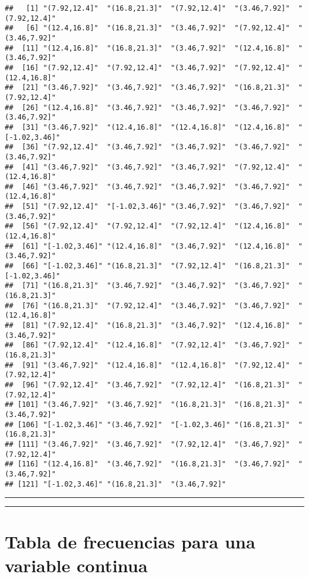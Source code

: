 \documentclass[
]{book}
\begin{document}
\begin{verbatim}
##   [1] "(7.92,12.4]"  "(16.8,21.3]"  "(7.92,12.4]"  "(3.46,7.92]"  "(7.92,12.4]" 
##   [6] "(12.4,16.8]"  "(16.8,21.3]"  "(3.46,7.92]"  "(7.92,12.4]"  "(3.46,7.92]" 
##  [11] "(12.4,16.8]"  "(16.8,21.3]"  "(3.46,7.92]"  "(12.4,16.8]"  "(3.46,7.92]" 
##  [16] "(7.92,12.4]"  "(7.92,12.4]"  "(3.46,7.92]"  "(7.92,12.4]"  "(12.4,16.8]" 
##  [21] "(3.46,7.92]"  "(3.46,7.92]"  "(3.46,7.92]"  "(16.8,21.3]"  "(7.92,12.4]" 
##  [26] "(12.4,16.8]"  "(3.46,7.92]"  "(3.46,7.92]"  "(3.46,7.92]"  "(3.46,7.92]" 
##  [31] "(3.46,7.92]"  "(12.4,16.8]"  "(12.4,16.8]"  "(12.4,16.8]"  "[-1.02,3.46]"
##  [36] "(7.92,12.4]"  "(3.46,7.92]"  "(3.46,7.92]"  "(3.46,7.92]"  "(3.46,7.92]" 
##  [41] "(3.46,7.92]"  "(3.46,7.92]"  "(3.46,7.92]"  "(7.92,12.4]"  "(12.4,16.8]" 
##  [46] "(3.46,7.92]"  "(3.46,7.92]"  "(3.46,7.92]"  "(3.46,7.92]"  "(12.4,16.8]" 
##  [51] "(7.92,12.4]"  "[-1.02,3.46]" "(3.46,7.92]"  "(3.46,7.92]"  "(3.46,7.92]" 
##  [56] "(7.92,12.4]"  "(7.92,12.4]"  "(7.92,12.4]"  "(12.4,16.8]"  "(12.4,16.8]" 
##  [61] "[-1.02,3.46]" "(12.4,16.8]"  "(3.46,7.92]"  "(12.4,16.8]"  "(3.46,7.92]" 
##  [66] "[-1.02,3.46]" "(16.8,21.3]"  "(7.92,12.4]"  "(16.8,21.3]"  "[-1.02,3.46]"
##  [71] "(16.8,21.3]"  "(3.46,7.92]"  "(3.46,7.92]"  "(3.46,7.92]"  "(16.8,21.3]" 
##  [76] "(16.8,21.3]"  "(7.92,12.4]"  "(3.46,7.92]"  "(3.46,7.92]"  "(12.4,16.8]" 
##  [81] "(7.92,12.4]"  "(16.8,21.3]"  "(3.46,7.92]"  "(12.4,16.8]"  "(3.46,7.92]" 
##  [86] "(7.92,12.4]"  "(12.4,16.8]"  "(7.92,12.4]"  "(3.46,7.92]"  "(16.8,21.3]" 
##  [91] "(3.46,7.92]"  "(12.4,16.8]"  "(12.4,16.8]"  "(7.92,12.4]"  "(7.92,12.4]" 
##  [96] "(7.92,12.4]"  "(3.46,7.92]"  "(7.92,12.4]"  "(16.8,21.3]"  "(7.92,12.4]" 
## [101] "(3.46,7.92]"  "(3.46,7.92]"  "(16.8,21.3]"  "(16.8,21.3]"  "(3.46,7.92]" 
## [106] "[-1.02,3.46]" "(3.46,7.92]"  "[-1.02,3.46]" "(16.8,21.3]"  "(16.8,21.3]" 
## [111] "(3.46,7.92]"  "(3.46,7.92]"  "(7.92,12.4]"  "(3.46,7.92]"  "(7.92,12.4]" 
## [116] "(12.4,16.8]"  "(3.46,7.92]"  "(16.8,21.3]"  "(3.46,7.92]"  "(3.46,7.92]" 
## [121] "[-1.02,3.46]" "(16.8,21.3]"  "(3.46,7.92]"
\end{verbatim}

\begin{center}\rule{0.5\linewidth}{0.5pt}\end{center}

\begin{center}\rule{0.5\linewidth}{0.5pt}\end{center}

\hypertarget{tabla-de-frecuencias-para-una-variable-continua}{%
\section{Tabla de frecuencias para una variable continua}\label{tabla-de-frecuencias-para-una-variable-continua}}
\end{document}
